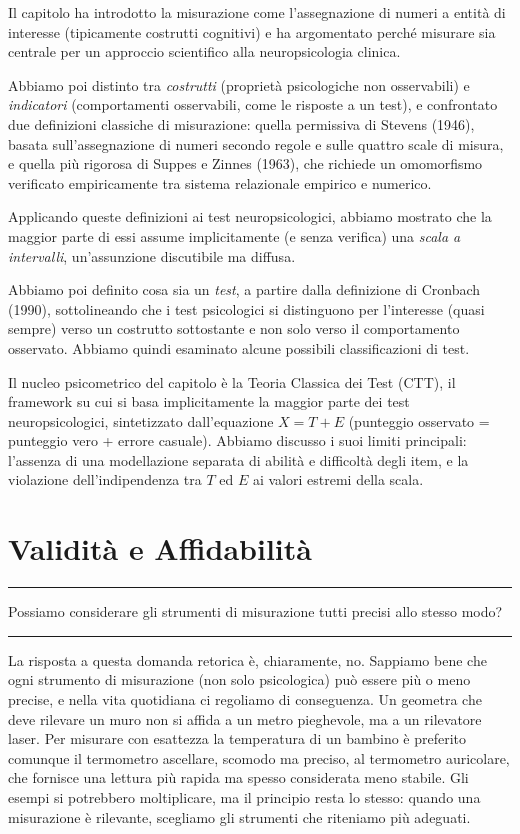 \documentclass[
  italian,
  letterpaper,
  paper=A4,
  headinclude=on,
  footinclude=on,
  12pt]{scrbook}
\newenvironment{domanda}{%
  \par\medskip\noindent\rule{\linewidth}{0.4pt}\vspace{3pt}%
  \begin{center}\large\itshape
}{%
  \end{center}\vspace{-4pt}\noindent\rule{\linewidth}{0.4pt}\par\medskip
}
\begin{document}
Il capitolo ha introdotto la misurazione come l'assegnazione di numeri a
entità di interesse (tipicamente costrutti cognitivi) e ha argomentato
perché misurare sia centrale per un approccio scientifico alla
neuropsicologia clinica.

Abbiamo poi distinto tra \emph{costrutti} (proprietà psicologiche non
osservabili) e \emph{indicatori} (comportamenti osservabili, come le
risposte a un test), e confrontato due definizioni classiche di
misurazione: quella permissiva di Stevens (1946), basata
sull'assegnazione di numeri secondo regole e sulle quattro scale di
misura, e quella più rigorosa di Suppes e Zinnes (1963), che richiede un
omomorfismo verificato empiricamente tra sistema relazionale empirico e
numerico.

Applicando queste definizioni ai test neuropsicologici, abbiamo mostrato
che la maggior parte di essi assume implicitamente (e senza verifica)
una \emph{scala a intervalli}, un'assunzione discutibile ma diffusa.

Abbiamo poi definito cosa sia un \emph{test}, a partire dalla
definizione di Cronbach (1990), sottolineando che i test psicologici si
distinguono per l'interesse (quasi sempre) verso un costrutto
sottostante e non solo verso il comportamento osservato. Abbiamo quindi
esaminato alcune possibili classificazioni di test.

Il nucleo psicometrico del capitolo è la Teoria Classica dei Test (CTT),
il framework su cui si basa implicitamente la maggior parte dei test
neuropsicologici, sintetizzato dall'equazione \(X = T + E\) (punteggio
osservato = punteggio vero + errore casuale). Abbiamo discusso i suoi
limiti principali: l'assenza di una modellazione separata di abilità e
difficoltà degli item, e la violazione dell'indipendenza tra \(T\) ed
\(E\) ai valori estremi della scala.


\chapter{Validità e Affidabilità}\label{validita-e-affidabilita}

\begin{domanda}

Possiamo considerare gli strumenti di misurazione tutti precisi allo
stesso modo?

\end{domanda}

La risposta a questa domanda retorica è, chiaramente, no. Sappiamo bene
che ogni strumento di misurazione (non solo psicologica) può essere più
o meno precise, e nella vita quotidiana ci regoliamo di conseguenza. Un
geometra che deve rilevare un muro non si affida a un metro pieghevole,
ma a un rilevatore laser. Per misurare con esattezza la temperatura di
un bambino è preferito comunque il termometro ascellare, scomodo ma
preciso, al termometro auricolare, che fornisce una lettura più rapida
ma spesso considerata meno stabile. Gli esempi si potrebbero
moltiplicare, ma il principio resta lo stesso: quando una misurazione è
rilevante, scegliamo gli strumenti che riteniamo più adeguati.
\end{document}
